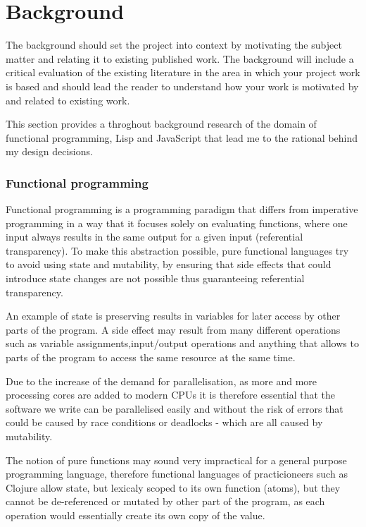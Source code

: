 \chapter{Background}
The background should set the project into context by motivating the subject matter and relating it to existing published work. The background will include a critical evaluation of the existing literature in the area in which your project work is based and should lead the reader to understand how your work is motivated by and related to existing work.

This section provides a throghout background research of the domain of functional programming, Lisp and JavaScript that lead me to the rational behind my design decisions.

\subsection{Functional programming}
Functional programming is a programming paradigm that differs from imperative programming in a way that it focuses solely on evaluating functions, where one input always results in the same output for a given input (referential transparency). To make this abstraction possible, pure functional languages try to avoid using state and mutability, by ensuring that side effects that could introduce state changes are not possible thus guaranteeing referential transparency.

An example of state is preserving results in variables for later access by other parts of the program. A side effect may result from many different operations such as variable assignments,input/output operations and anything that allows to parts of the program to access the same resource at the same time.

Due to the increase of the demand for parallelisation, as more and more processing cores are added to modern CPUs it is therefore essential that the software we write can be parallelised easily and without the risk of errors that could be caused by race conditions or deadlocks - which are all caused by mutability.

The notion of pure functions may sound very impractical for a general purpose programming language, therefore functional languages of practicioneers such as Clojure allow state, but lexicaly scoped to its own function (atoms), but they cannot be de-referenced or mutated by other part of the program, as each operation would essentially create its own copy of the value.

